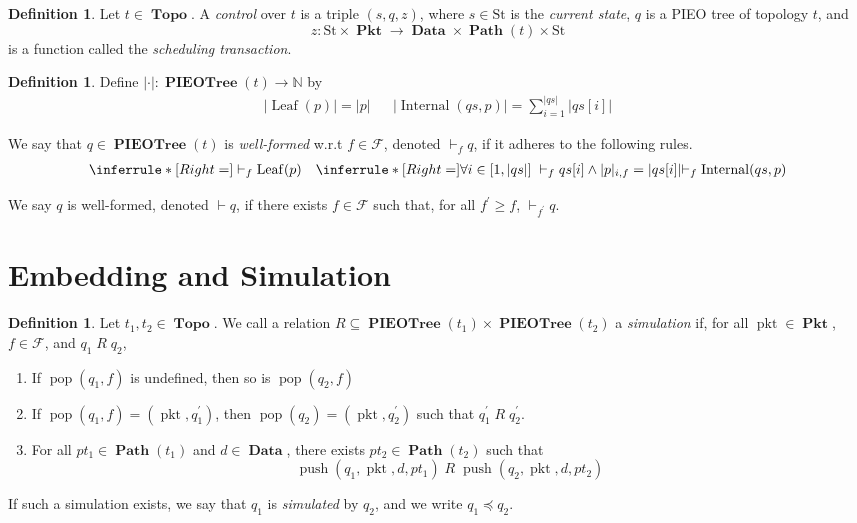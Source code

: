 \documentclass{amsart}
\newcommand{\inference}[3]{\inferrule*[Right=#1]{#2}{#3}}
\newcommand{\axiom}[2]{\inferrule*[Right=#1]{\;}{#2}}
\DeclareMathOperator{\pkt}{\mathrm{pkt}}
\DeclareMathOperator{\push}{\mathrm{push}}
\DeclareMathOperator{\pop}{\mathrm{pop}}
\DeclareMathOperator{\Pkt}{\mathbf{Pkt}}
\DeclareMathOperator{\Data}{\mathbf{Data}}
\DeclareMathOperator{\Topo}{\mathbf{Topo}}
\DeclareMathOperator{\Path}{\mathbf{Path}}
\DeclareMathOperator{\PIEOTree}{\mathbf{PIEOTree}}
\DeclareMathOperator{\Leaf}{\mathrm{Leaf}}
\DeclareMathOperator{\Internal}{\mathrm{Internal}}
\theoremstyle{definition}
\newtheorem{dfn}[thm]{Definition}
\begin{document}
\begin{dfn}
    Let $t \in \Topo$. 
    A \emph{control} over $t$ is a triple $(s, q, z)$, where $s \in \mathrm{St}$ is the \emph{current state},
    $q$ is a PIEO tree of topology $t$, and 
    $$z : \mathrm{St} \times \Pkt \to \Data \times \Path(t) \times \mathrm{St}$$
    is a function called the \emph{scheduling transaction}.
\end{dfn}

\begin{dfn}
    Define $|\cdot| : \PIEOTree(t) \to \mathbb N$ by
    \begin{align*}
        |\Leaf(p)| = |p| && |\Internal(qs, p)| = \sum_{i=1}^{|qs|} |qs[i]|
    \end{align*}

    We say that $q \in \PIEOTree(t)$ is \emph{well-formed} w.r.t $f \in \mathcal F$, denoted $\vdash_f q$, if it adheres to the following rules.
    \begin{align*}
        \axiom{}
        {\vdash_f \Leaf(p)}
        &&
        \inference{}
        {
            \forall i \in [1, |qs|] \; \vdash_f qs[i] \land |p|_{i, f} = |qs[i]|
        }
        {
            \vdash_f \Internal(qs, p)
        }
    \end{align*}

    We say $q$ is well-formed, denoted $\vdash q$, if there exists $f \in \mathcal F$ such that, for all $f^\prime \geq f$, $\vdash_{f^\prime} q$.
\end{dfn}

\section{Embedding and Simulation}

\begin{dfn}
    Let $t_1, t_2 \in \Topo$. 
    We call a relation $R \subseteq \PIEOTree(t_1) \times \PIEOTree(t_2)$ a \emph{simulation} if, 
    for all $\pkt \in \Pkt$, $f \in \mathcal F$, and $q_1 \; R \; q_2$,
    \begin{enumerate}
        \item If $\pop(q_1, f)$ is undefined, then so is $\pop(q_2, f)$
        \item If $\pop(q_1, f) = (\pkt, q_1^\prime)$, then $\pop(q_2) = (\pkt, q_2^\prime)$ such that $q_1^\prime \; R \; q_2^\prime$.
        \item For all $pt_1 \in \Path(t_1)$ and $d \in \Data$, there exists $pt_2 \in \Path(t_2)$ such that
            $$\push(q_1, \pkt, d, pt_1) \; R \; \push(q_2, \pkt, d, pt_2)$$
    \end{enumerate}
    If such a simulation exists, we say that $q_1$ is \emph{simulated} by $q_2$, and we write $q_1 \preccurlyeq q_2$.
\end{dfn}
\end{document}
